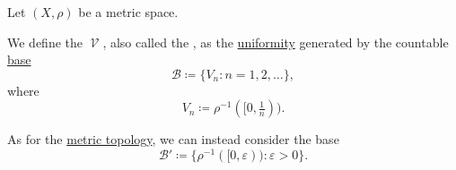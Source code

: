 \begin{definition}\label{def:metric_uniformity}
  Let \( (X, \rho) \) be a metric space.

  We define the  \( \mscrV \), also called the , as the \hyperref[def:uniform_space]{uniformity} generated by the countable \hyperref[thm:uniform_space_base_axioms]{base}
  \begin{equation}\label{def:metric_uniformity/integer_base}
    \mathcal{B} \coloneqq \{ V_n \colon n = 1, 2, \ldots \},
  \end{equation}
  where
  \begin{equation*}
    V_n \coloneqq \rho^{-1}([0, \tfrac 1 n)).
  \end{equation*}

  As for the \hyperref[def:metric_topology]{metric topology}, we can instead consider the base
  \begin{equation}\label{def:metric_uniformity/real_base}
    \mathcal{B}' \coloneqq \{ \rho^{-1}([0, \varepsilon)) \colon \varepsilon > 0 \}.
  \end{equation}
\end{definition}
